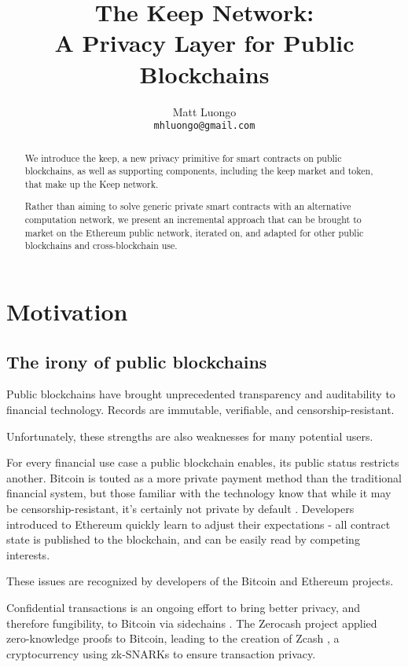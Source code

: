 \documentclass[11pt]{article}
\title{The Keep Network:\protect\\A Privacy Layer for Public Blockchains}
\author{Matt Luongo \\
  {\tt mhluongo@gmail.com}}
\date{}
\begin{document}
 \maketitle \begin{abstract}

  We introduce the keep, a new privacy primitive for smart contracts
  on public blockchains, as well as supporting components, including
  the keep market and token, that make up the Keep network.

  Rather than aiming to solve generic private smart contracts with an
  alternative computation network, we present an incremental approach
  that can be brought to market on the Ethereum public network,
  iterated on, and adapted for other public blockchains and
  cross-blockchain use.

\end{abstract}

\section{Motivation}

\subsection{The irony of public blockchains}

Public blockchains have brought unprecedented transparency and
auditability to financial technology. Records are immutable,
verifiable, and censorship-resistant.

Unfortunately, these strengths are also weaknesses for many potential
users.

For every financial use case a public blockchain enables, its public
status restricts another. Bitcoin is touted as a more private payment
method than the traditional financial system, but those familiar with
the technology know that while it may be censorship-resistant, it’s
certainly not private by default \cite{bitcoinPrivacy}. Developers
introduced to Ethereum quickly learn to adjust their expectations
\cite{ethereumStackexchange}- all contract state is published to the
blockchain, and can be easily read by competing interests.

These issues are recognized by developers of the Bitcoin and Ethereum
projects.

Confidential transactions \cite{confidentialTransactions} is an
ongoing effort to bring better privacy, and therefore fungibility, to
Bitcoin via sidechains \cite{confidentialTransactionsElements}. The
Zerocash project \cite{zerocash} applied zero-knowledge proofs to
Bitcoin, leading to the creation of Zcash \cite{zcash}, a
cryptocurrency using zk-SNARKs to ensure transaction privacy.
\end{document}
